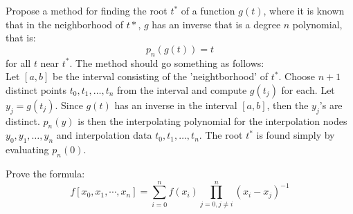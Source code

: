 \documentclass{article}
\begin{document}
Propose a method for finding the root $t^*$ of a function $g(t)$, where it is known that in the 
neighborhood of $t*$, $g$ has an inverse that is a degree $n$ polynomial, that is:
\[
	p_n(g(t))=t
	\]
for all $t$ near $t^*$.
The method should go something as follows:\\
Let $[a,b]$ be the interval consisting of the 'neightborhood' of $t^*$.  Choose 
$n+1$ distinct points $t_0,t_1,\dots,t_n$ from the interval and compute $g(t_j)$ for 
each.  Let $y_j=g(t_j)$. Since $g(t)$ has an inverse in the interval $[a,b]$, then the $y_j$'s are 
distinct.  $p_n(y)$ is then the interpolating polynomial for the interpolation nodes 
$y_0,y_1,\dots,y_n$ and interpolation data $t_0,t_1,\dots,t_n$.  The root $t^*$ is found simply by
evaluating $p_n(0)$.

Prove the formula:
$$f[x_0,x_1,\cdots,x_n] = \sum_{i=0}^{n} f(x_i) \prod_{j=0,j\neq i}^{n} (x_i - x_j)^{-1}$$
\end{document}
